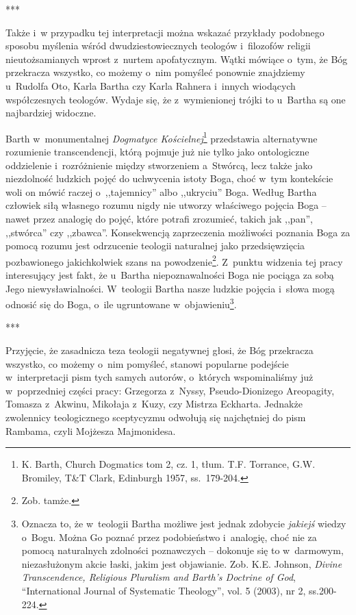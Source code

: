 ***

Także i~w przypadku tej interpretacji można wskazać przykłady podobnego sposobu myślenia wśród dwudziestowiecznych teologów i~filozofów religii nieutożsamianych wprost z~nurtem apofatycznym. Wątki mówiące o~tym, że Bóg przekracza wszystko, co możemy o~nim pomyśleć ponownie znajdziemy u~Rudolfa Oto, Karla Bartha czy Karla Rahnera i~innych wiodących współczesnych teologów. Wydaje się, że z~wymienionej trójki to u~Bartha są one najbardziej widoczne.

Barth w~monumentalnej \textit{Dogmatyce Kościelnej}\footnote{K. Barth, Church Dogmatics tom 2, cz. 1, tłum. T.F. Torrance, G.W. Bromiley, T\&T Clark, Edinburgh 1957, ss.~179-204.} przedstawia alternatywne rozumienie transcendencji, którą pojmuje już nie tylko jako ontologiczne oddzielenie i~rozróżnienie między stworzeniem a~Stwórcą, lecz także jako niezdolność ludzkich pojęć do uchwycenia istoty Boga, choć w~tym kontekście woli on mówić raczej o~,,tajemnicy'' albo ,,ukryciu'' Boga. Według Bartha człowiek siłą własnego rozumu nigdy nie utworzy właściwego pojęcia Boga -- nawet przez analogię do pojęć, które potrafi zrozumieć, takich jak ,,pan'', ,,stwórca'' czy ,,zbawca''. Konsekwencją zaprzeczenia możliwości poznania Boga za pomocą rozumu jest odrzucenie teologii naturalnej jako przedsięwzięcia pozbawionego jakichkolwiek szans na powodzenie\footnote{Zob. tamże.}. Z~punktu widzenia tej pracy interesujący jest fakt, że u~Bartha niepoznawalności Boga nie pociąga za sobą Jego niewysławialności. W~teologii Bartha nasze ludzkie pojęcia i~słowa mogą odnosić się do Boga, o~ile ugruntowane w~objawieniu\footnote{Oznacza to, że w~teologii Bartha możliwe jest jednak zdobycie \textit{jakiejś} wiedzy o~Bogu. Można Go poznać przez podobieństwo i~analogię, choć nie za pomocą naturalnych zdolności poznawczych -- dokonuje się to w~darmowym, niezasłużonym akcie łaski, jakim jest objawianie. Zob. K.E. Johnson, \textit{Divine Transcendence, Religious Pluralism and Barth's Doctrine of God}, ``International Journal of Systematic Theology'', vol. 5 (2003), nr 2, ss.200-224.}.

***

Przyjęcie, że zasadnicza teza teologii negatywnej głosi, że Bóg przekracza wszystko, co możemy o~nim pomyśleć, stanowi popularne podejście w~interpretacji pism tych samych autorów, o~których wspominaliśmy już w~poprzedniej części pracy: Grzegorza z~Nyssy, Pseudo-Dionizego Areopagity, Tomasza z~Akwinu, Mikołaja z~Kuzy, czy Mistrza Eckharta. Jednakże zwolennicy teologicznego sceptycyzmu odwołują się najchętniej do pism Rambama, czyli Mojżesza Majmonidesa.

